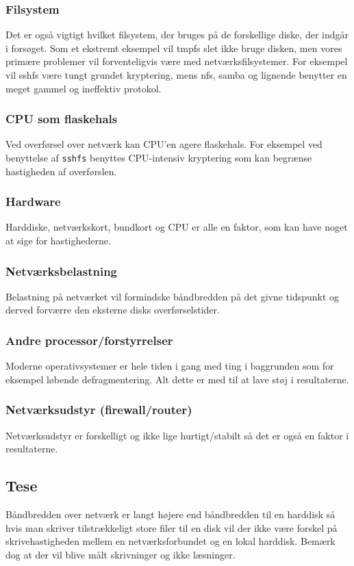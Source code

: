 \documentclass{article}
\begin{document}
\subsubsection{Filsystem}
Det er også vigtigt hvilket filsystem, der bruges på de forskellige diske, der indgår i forsøget. Som et ekstremt eksempel vil tmpfs slet ikke bruge disken, men vores primære problemer vil forventeligvis være med netværksfilsystemer. For eksempel vil sshfs være tungt grundet kryptering, mens nfs, samba og lignende benytter en meget gammel og ineffektiv protokol.

\subsubsection{CPU som flaskehals}
Ved overførsel over netværk kan CPU'en agere flaskehals. For eksempel ved benyttelse af {\tt sshfs} benyttes CPU-intensiv kryptering som kan begrænse hastigheden af overførslen.

\subsubsection{Hardware}
Harddiske, netværkskort, bundkort og CPU er alle en faktor, som kan have noget at sige for hastighederne.

\subsubsection{Netværksbelastning}
Belastning på netværket vil formindske båndbredden på det givne tidspunkt og derved forværre den eksterne disks overførselstider.

\subsubsection{Andre processor/forstyrrelser}
Moderne operativsystemer er hele tiden i gang med ting i baggrunden som for eksempel løbende defragmentering. Alt dette er med til at lave støj i resultaterne.

\subsubsection{Netværksudstyr (firewall/router)}
Netværksudstyr er forskelligt og ikke lige hurtigt/stabilt så det er også en faktor i resultaterne.

\subsection{Tese}
Båndbredden over netværk er langt højere end båndbredden til en harddisk så hvis man skriver tilstrækkeligt store filer til en disk vil der ikke være forskel på skrivehastigheden mellem en netværksforbundet og en lokal harddisk. Bemærk dog at der vil blive målt skrivninger og ikke læsninger.
\end{document}
